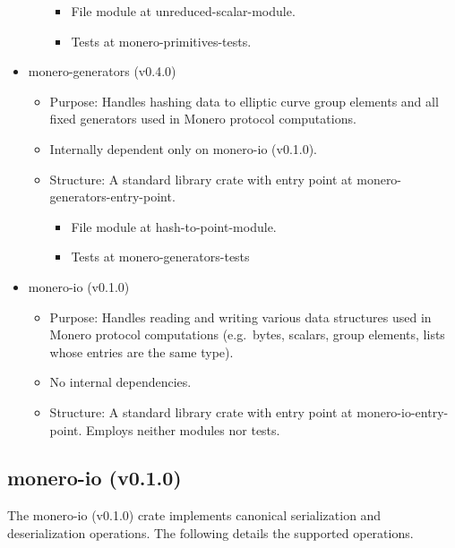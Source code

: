 \begin{itemize}
\begin{itemize}
\begin{itemize}
   \item File module at \gls{unreduced-scalar-module}.
   \item Tests at \gls{monero-primitives-tests}.
   \end{itemize}
   \end{itemize}


 
\item \gls{monero-generators (v0.4.0)}
   \begin{itemize}
   \item Purpose: Handles hashing data to elliptic curve group elements and all fixed generators used in Monero protocol computations.
   \item Internally dependent only on \gls{monero-io (v0.1.0)}.
   \item Structure: A standard library crate with entry point at \gls{monero-generators-entry-point}. 
   \begin{itemize}
   
   \item File module at \gls{hash-to-point-module}. 
   \item Tests at \gls{monero-generators-tests}
   \end{itemize}
   \end{itemize}
   
\item \gls{monero-io (v0.1.0)} 
   \begin{itemize}
   \item Purpose: Handles reading and writing various data structures used in Monero protocol computations (e.g.\ bytes, scalars, group elements, lists whose entries are the same type).
   \item No internal dependencies.
   \item Structure: A standard library crate with entry point at \gls{monero-io-entry-point}. Employs neither modules nor tests.   
\end{itemize}

\end{itemize}



\subsection{monero-io (v0.1.0)}
The \gls{monero-io (v0.1.0)} crate implements canonical serialization and deserialization operations.  The following details the supported operations.  

